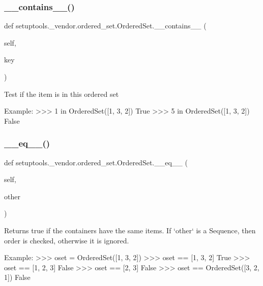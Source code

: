 \subsubsection{\texorpdfstring{\+\_\+\+\_\+contains\+\_\+\+\_\+()}{\_\_contains\_\_()}}
{\footnotesize\ttfamily def setuptools.\+\_\+vendor.\+ordered\+\_\+set.\+Ordered\+Set.\+\_\+\+\_\+contains\+\_\+\+\_\+ (\begin{DoxyParamCaption}\item[{}]{self,  }\item[{}]{key }\end{DoxyParamCaption})}

\begin{DoxyVerb}Test if the item is in this ordered set

Example:
    >>> 1 in OrderedSet([1, 3, 2])
    True
    >>> 5 in OrderedSet([1, 3, 2])
    False
\end{DoxyVerb}
 \mbox{\label{classsetuptools_1_1__vendor_1_1ordered__set_1_1OrderedSet_a659f21309131e5f217ae8b0ac5f834ad}} 
\subsubsection{\texorpdfstring{\+\_\+\+\_\+eq\+\_\+\+\_\+()}{\_\_eq\_\_()}}
{\footnotesize\ttfamily def setuptools.\+\_\+vendor.\+ordered\+\_\+set.\+Ordered\+Set.\+\_\+\+\_\+eq\+\_\+\+\_\+ (\begin{DoxyParamCaption}\item[{}]{self,  }\item[{}]{other }\end{DoxyParamCaption})}

\begin{DoxyVerb}Returns true if the containers have the same items. If `other` is a
Sequence, then order is checked, otherwise it is ignored.

Example:
    >>> oset = OrderedSet([1, 3, 2])
    >>> oset == [1, 3, 2]
    True
    >>> oset == [1, 2, 3]
    False
    >>> oset == [2, 3]
    False
    >>> oset == OrderedSet([3, 2, 1])
    False
\end{DoxyVerb}
 \mbox{\label{classsetuptools_1_1__vendor_1_1ordered__set_1_1OrderedSet_afa5d263824cc35374a0cf762672f68ae}} 
